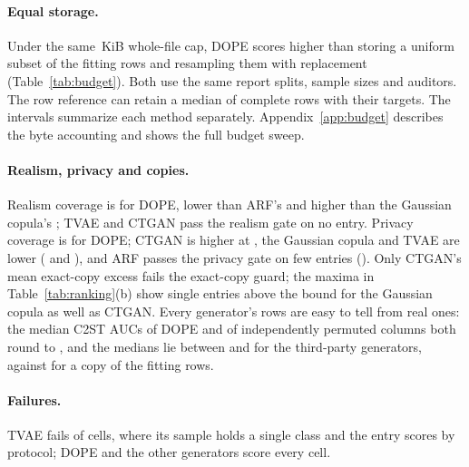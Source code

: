 \paragraph{Equal storage.}
Under the same \,KiB whole-file cap, DOPE scores higher than storing a uniform subset of the fitting rows and resampling them with replacement (Table~\ref{tab:budget}). Both use the same report splits, sample sizes and auditors. The row reference can retain a median of  complete rows with their targets. The intervals summarize each method separately. Appendix~\ref{app:budget} describes the byte accounting and shows the full budget sweep.

\begin{table}[t]
  \centering\footnotesize
  \caption{The signed engine and stored fitting rows under the same \,KiB whole-file cap, on the report DEV schedule. The intervals are  family-bootstrap intervals for each method. Median and maximum sizes include the file header.}
  \label{tab:budget}
  
\end{table}

\paragraph{Realism, privacy and copies.}
Realism coverage is  for DOPE, lower than ARF's  and higher than the Gaussian copula's ; TVAE and CTGAN pass the realism gate on no entry.
Privacy coverage is  for DOPE; CTGAN is higher at , the Gaussian copula and TVAE are lower ( and ), and ARF passes the privacy gate on few entries ().
Only CTGAN's mean exact-copy excess fails the exact-copy guard; the maxima in Table~\ref{tab:ranking}(b) show single entries above the bound for the Gaussian copula as well as CTGAN.
Every generator's rows are easy to tell from real ones: the median C2ST AUCs of DOPE and of independently permuted columns both round to , and the medians lie between  and  for the third-party generators, against  for a copy of the fitting rows.

\paragraph{Failures.}
TVAE fails  of  cells, where its sample holds a single class and the entry scores  by protocol; DOPE and the other generators score every cell.

